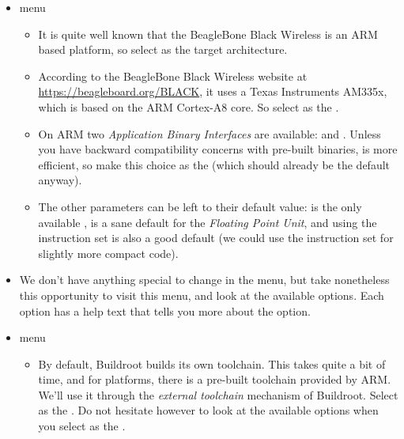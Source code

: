 \begin{itemize}

\item {} menu

  \begin{itemize}

  \item It is quite well known that the BeagleBone Black Wireless is
    an ARM based platform, so select  as the
    target architecture.

  \item According to the BeagleBone Black Wireless website at
    \url{https://beagleboard.org/BLACK}, it uses a Texas Instruments
    AM335x, which is based on the ARM Cortex-A8 core. So select
     as the .

  \item On ARM two {\em Application Binary Interfaces} are available:
     and . Unless you have backward
    compatibility concerns with pre-built binaries,  is
    more efficient, so make this choice as the 
    (which should already be the default anyway).

  \item The other parameters can be left to their default value:
     is the only available ,
     is a sane default for the {\em Floating Point
      Unit}, and using the  instruction set is also a good
    default (we could use the  instruction set for
    slightly more compact code).

  \end{itemize}

\item We don't have anything special to change in the
   menu, but take nonetheless this opportunity to
  visit this menu, and look at the available options. Each option has
  a help text that tells you more about the option.

\item {} menu

  \begin{itemize}

  \item By default, Buildroot builds its own toolchain. This takes
    quite a bit of time, and for  platforms, there is a
    pre-built toolchain provided by ARM. We'll use it through the
    {\em external toolchain} mechanism of Buildroot. Select
     as the . Do not
    hesitate however to look at the available options when you select
     as the .


\end{itemize}
\end{itemize}
